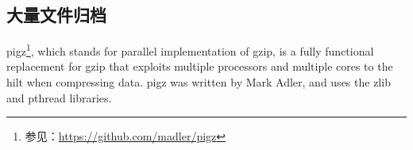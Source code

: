 \documentclass[../../../interview-questions.tex]{subfiles}
\begin{document}
\subsection{大量文件归档}

pigz\footnote{参见：\url{https://github.com/madler/pigz}}, which stands for parallel implementation of gzip, is a fully functional replacement for gzip that exploits multiple processors and multiple cores to the hilt when compressing data. pigz was written by Mark Adler, and uses the zlib and pthread libraries. 
\end{document}
